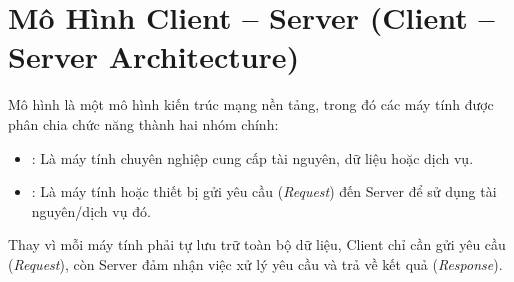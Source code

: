 \section{Mô Hình Client -- Server (Client -- Server Architecture)}
\label{sec:client_server}

Mô hình  là một mô hình kiến trúc mạng nền tảng, trong đó các máy tính được phân chia chức năng thành hai nhóm chính:

\begin{itemize}
    \item {}: Là máy tính chuyên nghiệp cung cấp tài nguyên, dữ liệu hoặc dịch vụ.
    \item {}: Là máy tính hoặc thiết bị gửi yêu cầu (\textit{Request}) đến Server để sử dụng tài nguyên/dịch vụ đó.
\end{itemize}

Thay vì mỗi máy tính phải tự lưu trữ toàn bộ dữ liệu, Client chỉ cần gửi yêu cầu (\textit{Request}), còn Server đảm nhận việc xử lý yêu cầu và trả về kết quả (\textit{Response}).

